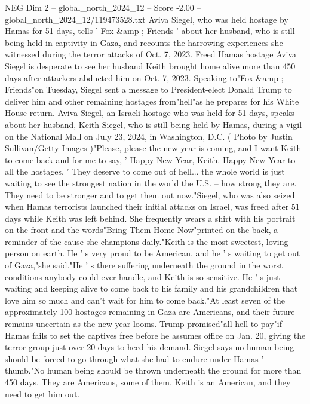 \begin{textsample}{NEG Dim 2 – global\_north\_2024\_12 – Score -2.00 – global\_north\_2024\_12/119473528.txt}  \label{ex:f2_neg_259}
Aviva Siegel, who was held hostage by Hamas for 51 days, tells ' Fox \&amp ; Friends ' about her husband, who is still being held in captivity in Gaza, and recounts the harrowing experiences she witnessed during the terror attacks of Oct. 7, 2023.
Freed Hamas hostage Aviva Siegel is desperate to see her husband Keith brought home alive more than 450 days after attackers abducted him on Oct. 7, 2023.
Speaking to"Fox \&amp ; Friends"on Tuesday, Siegel sent a message to President-elect Donald Trump to deliver him and other remaining hostages from"hell"as he prepares for his White House return.
Aviva Siegel, an Israeli hostage who was held for 51 days, speaks about her husband, Keith Siegel, who is still being held by Hamas, during a vigil on the National Mall on July 23, 2024, in Washington, D.C. ( Photo by Justin Sullivan/Getty Images )"Please, please the new year is coming, and I want Keith to come back and for me to say, ' Happy New Year, Keith.
Happy New Year to all the hostages. ' They deserve to come out of hell... the whole world is just waiting to see the strongest nation in the world the U.S. -- how strong they are.
They need to be stronger and to get them out now."Siegel, who was also seized when Hamas terrorists launched their initial attacks on Israel, was freed after 51 days while Keith was left behind.
She frequently wears a shirt with his portrait on the front and the words"Bring Them Home Now"printed on the back, a reminder of the cause she champions daily."Keith is the most sweetest, loving person on earth.
He ' s very proud to be American, and he ' s waiting to get out of Gaza,"she said."He ' s there suffering underneath the ground in the worst conditions anybody could ever handle, and Keith is so sensitive.
He ' s just waiting and keeping alive to come back to his family and his grandchildren that love him so much and can't wait for him to come back."At least seven of the approximately 100 hostages remaining in Gaza are Americans, and their future remains uncertain as the new year looms.
Trump promised"all hell to pay"if Hamas fails to set the captives free before he assumes office on Jan. 20, giving the terror group just over 20 days to heed his demand.
Siegel says no human being should be forced to go through what she had to endure under Hamas ' thumb."No human being should be thrown underneath the ground for more than 450 days.
They are Americans, some of them.
Keith is an American, and they need to get him out.

\end{textsample}
